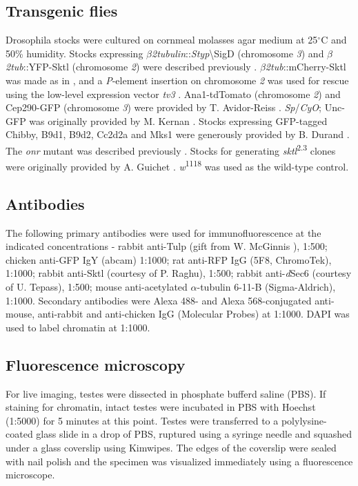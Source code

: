 \documentclass[12pt, twoside, letterpaper]{article}
\begin{document}
\subsection{Transgenic flies}
Drosophila stocks were cultured on cornmeal molasses agar medium at 25$^{\circ}$C
and 50\% humidity.
Stocks expressing $\beta$\textit{2tubulin}::\textit{Styp}\textbackslash{SigD} (chromosome \textit{3})
and $\beta$\textit{2tub}::YFP-Sktl (chromosome \textit{2})
were described previously \citep{wei2008depletion, fabian2010phosphatidylinositol}.
$\beta$\textit{2tub}::mCherry-Sktl was made as in \citep{wei2008depletion},
and a \textit{P}-element insertion on chromosome \textit{2} was used for rescue using the low-level
expression vector \textit{tv3} \citep{wong2005pip2}.
Ana1-tdTomato (chromosome \textit{2}) and Cep290-GFP (chromosome \textit{3}) were provided
by T. Avidor-Reiss \citep{basiri2014migrating}.
\textit{Sp}/\textit{CyO}; Unc-GFP was originally provided by M. Kernan \citep{baker2004mechanosensory}.
Stocks expressing GFP-tagged Chibby, B9d1, B9d2, Cc2d2a and Mks1 were generously
provided by B. Durand \citep{enjolras2012drosophila, vieillard2016transition}.
The \textit{onr} mutant was described previously \citep{giansanti2015exocyst}.
Stocks for generating \textit{sktl}\textsuperscript{2.3} clones were originally provided by
A. Guichet \citep{gervais2008pip5k}.
\textit{w}\textsuperscript{1118} was used as the wild-type control.

\subsection{Antibodies}
The following primary antibodies were used for immunofluorescence
at the indicated concentrations - 
rabbit anti-Tulp (gift from W. McGinnis \citep{ronshaugen2002structure}), 1:500; 
chicken anti-GFP IgY (abcam) 1:1000;
rat anti-RFP IgG (5F8, ChromoTek), 1:1000;
rabbit anti-Sktl (courtesy of P. Raghu), 1:500;
rabbit anti-\textit{d}Sec6 (courtesy of U. Tepass), 1:500;
mouse anti-acetylated $\alpha$-tubulin 6-11-B (Sigma-Aldrich), 1:1000.
Secondary antibodies were Alexa 488- and Alexa 568-conjugated
anti-mouse, anti-rabbit and anti-chicken
IgG (Molecular Probes) at 1:1000.
DAPI was used to label chromatin at 1:1000.

\subsection{Fluorescence microscopy}
For live imaging, testes were dissected in phosphate bufferd saline (PBS).
If staining for chromatin, intact testes were incubated in PBS with
Hoechst (1:5000) for 5 minutes at this point.
Testes were transferred to a polylysine-coated glass slide in a drop of PBS,
ruptured using a syringe needle and
squashed under a glass coverslip using Kimwipes.
The edges of the coverslip were sealed with nail polish
and the specimen was visualized immediately using a fluorescence microscope.
\end{document}
